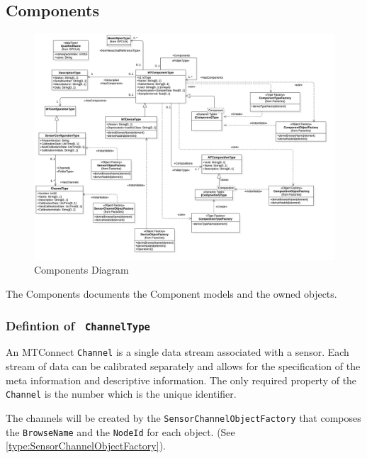 \subsection{Components}

\begin{figure}[ht]
  \centering
    \includegraphics[width=1.0\textwidth]{diagrams/Components.png}
  \caption{Components Diagram}
  \label{fig:Components}
\end{figure}

\FloatBarrier


The Components documents the Component models and the owned objects.

\subsubsection{Defintion of \texttt{ ChannelType}} \label{type:ChannelType}

\FloatBarrier

An MTConnect \texttt{Channel} is a single data stream associated with a sensor. Each stream
of data can be calibrated separately and allows for the specification of the meta information
and descriptive information. The only required property of the \texttt{Channel} is the number
which is the unique identifier.

The channels will be created by the \texttt{SensorChannelObjectFactory} that composes the \texttt{BrowseName} 
and the \texttt{NodeId} for each object. (See \ref{type:SensorChannelObjectFactory}).

